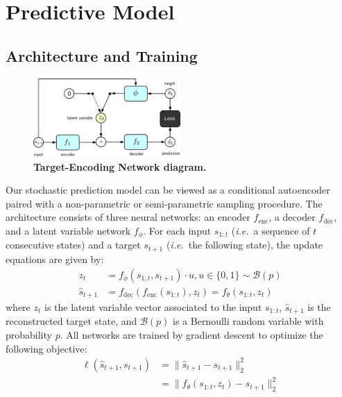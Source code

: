 \documentclass{article}
\begin{document}
\section{Predictive Model}

\subsection{Architecture and Training}

\begin{figure}
  \centering
  \includegraphics[width=0.5\textwidth]{images/ae_train-crop.pdf}
  \caption{
    \textbf{Target-Encoding Network diagram.}
  }
\end{figure}

Our stochastic prediction model can be viewed as a conditional autoencoder paired with a non-parametric  or semi-parametric sampling procedure.
The architecture consists of three neural networks: an encoder $f_\text{enc}$, a decoder $f_\text{dec}$, and a latent variable network $f_\phi$.
For each input $s_{1:t}$ (\emph{i.e.}\ a sequence of $t$ consecutive states) and a target $s_{t+1}$ (\emph{i.e.}\ the following state), the update equations are given by:
%
\begin{align}
  \label{eq:update-eqn}
  z_t &= f_\phi(s_{1:t}, s_{t+1}) \cdot u, u \in \{0, 1\} \sim \mathcal{B}(p) \\
  \hat{s}_{t+1} &= f_\text{dec}(f_\text{enc}(s_{1:t}), z_t) = f_\theta(s_{1:t}, z_t)
\end{align}
%
where $z_t$ is the latent variable vector associated to the input $s_{1:t}$, $\hat{s}_{t + 1}$ is the reconstructed target state, and $\mathcal{B}(p)$ is a Bernoulli random variable with probability $p$.
All networks are trained by gradient descent to optimize the following objective:
%
\begin{align}
  \ell(\hat{s}_{t+1}, s_{t+1}) &= \lVert \hat{s}_{t+1} - s_{t+1} \rVert_2^2 \\
  &= \lVert f_\theta(s_{1:t}, z_t) - s_{t+1} \rVert_2^2
\end{align}
\end{document}
